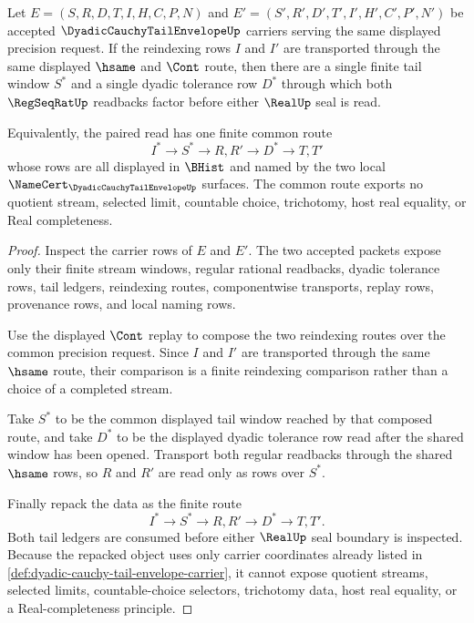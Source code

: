 \begin{theorem}
\label{thm:dyadic-cauchy-tail-envelope-common-refinement}
Let $E=(S,R,D,T,I,H,C,P,N)$ and $E'=(S',R',D',T',I',H',C',P',N')$ be accepted $\DyadicCauchyTailEnvelopeUp$ carriers serving the same displayed precision request. If the reindexing rows $I$ and $I'$ are transported through the same displayed $\hsame$ and $\Cont$ route, then there are a single finite tail window $S^*$ and a single dyadic tolerance row $D^*$ through which both $\RegSeqRatUp$ readbacks factor before either $\RealUp$ seal is read.

Equivalently, the paired read has one finite common route
$$
I^* \longrightarrow S^* \longrightarrow R,R' \longrightarrow D^* \longrightarrow T,T'
$$
whose rows are all displayed in $\BHist$ and named by the two local $\NameCert_{\DyadicCauchyTailEnvelopeUp}$ surfaces. The common route exports no quotient stream, selected limit, countable choice, trichotomy, host real equality, or Real completeness.
\end{theorem}
\begin{proof}
Inspect the carrier rows of $E$ and $E'$. The two accepted packets expose only their finite stream windows, regular rational readbacks, dyadic tolerance rows, tail ledgers, reindexing routes, componentwise transports, replay rows, provenance rows, and local naming rows.

Use the displayed $\Cont$ replay to compose the two reindexing routes over the common precision request. Since $I$ and $I'$ are transported through the same $\hsame$ route, their comparison is a finite reindexing comparison rather than a choice of a completed stream.

Take $S^*$ to be the common displayed tail window reached by that composed route, and take $D^*$ to be the displayed dyadic tolerance row read after the shared window has been opened. Transport both regular readbacks through the shared $\hsame$ rows, so $R$ and $R'$ are read only as rows over $S^*$.

Finally repack the data as the finite route
$$
I^* \longrightarrow S^* \longrightarrow R,R' \longrightarrow D^* \longrightarrow T,T' .
$$
Both tail ledgers are consumed before either $\RealUp$ seal boundary is inspected. Because the repacked object uses only carrier coordinates already listed in \autoref{def:dyadic-cauchy-tail-envelope-carrier}, it cannot expose quotient streams, selected limits, countable-choice selectors, trichotomy data, host real equality, or a Real-completeness principle.
\end{proof}

